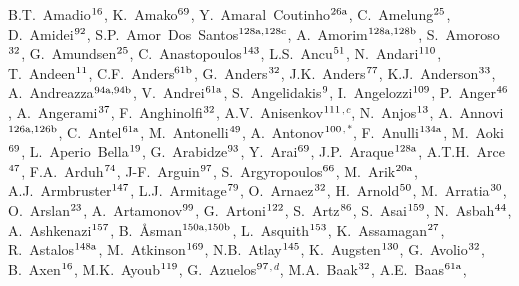 \begin{flushleft}
B.T.~Amadio$^\textrm{\scriptsize 16}$,
K.~Amako$^\textrm{\scriptsize 69}$,
Y.~Amaral~Coutinho$^\textrm{\scriptsize 26a}$,
C.~Amelung$^\textrm{\scriptsize 25}$,
D.~Amidei$^\textrm{\scriptsize 92}$,
S.P.~Amor~Dos~Santos$^\textrm{\scriptsize 128a,128c}$,
A.~Amorim$^\textrm{\scriptsize 128a,128b}$,
S.~Amoroso$^\textrm{\scriptsize 32}$,
G.~Amundsen$^\textrm{\scriptsize 25}$,
C.~Anastopoulos$^\textrm{\scriptsize 143}$,
L.S.~Ancu$^\textrm{\scriptsize 51}$,
N.~Andari$^\textrm{\scriptsize 110}$,
T.~Andeen$^\textrm{\scriptsize 11}$,
C.F.~Anders$^\textrm{\scriptsize 61b}$,
G.~Anders$^\textrm{\scriptsize 32}$,
J.K.~Anders$^\textrm{\scriptsize 77}$,
K.J.~Anderson$^\textrm{\scriptsize 33}$,
A.~Andreazza$^\textrm{\scriptsize 94a,94b}$,
V.~Andrei$^\textrm{\scriptsize 61a}$,
S.~Angelidakis$^\textrm{\scriptsize 9}$,
I.~Angelozzi$^\textrm{\scriptsize 109}$,
P.~Anger$^\textrm{\scriptsize 46}$,
A.~Angerami$^\textrm{\scriptsize 37}$,
F.~Anghinolfi$^\textrm{\scriptsize 32}$,
A.V.~Anisenkov$^\textrm{\scriptsize 111}$$^{,c}$,
N.~Anjos$^\textrm{\scriptsize 13}$,
A.~Annovi$^\textrm{\scriptsize 126a,126b}$,
C.~Antel$^\textrm{\scriptsize 61a}$,
M.~Antonelli$^\textrm{\scriptsize 49}$,
A.~Antonov$^\textrm{\scriptsize 100}$$^{,*}$,
F.~Anulli$^\textrm{\scriptsize 134a}$,
M.~Aoki$^\textrm{\scriptsize 69}$,
L.~Aperio~Bella$^\textrm{\scriptsize 19}$,
G.~Arabidze$^\textrm{\scriptsize 93}$,
Y.~Arai$^\textrm{\scriptsize 69}$,
J.P.~Araque$^\textrm{\scriptsize 128a}$,
A.T.H.~Arce$^\textrm{\scriptsize 47}$,
F.A.~Arduh$^\textrm{\scriptsize 74}$,
J-F.~Arguin$^\textrm{\scriptsize 97}$,
S.~Argyropoulos$^\textrm{\scriptsize 66}$,
M.~Arik$^\textrm{\scriptsize 20a}$,
A.J.~Armbruster$^\textrm{\scriptsize 147}$,
L.J.~Armitage$^\textrm{\scriptsize 79}$,
O.~Arnaez$^\textrm{\scriptsize 32}$,
H.~Arnold$^\textrm{\scriptsize 50}$,
M.~Arratia$^\textrm{\scriptsize 30}$,
O.~Arslan$^\textrm{\scriptsize 23}$,
A.~Artamonov$^\textrm{\scriptsize 99}$,
G.~Artoni$^\textrm{\scriptsize 122}$,
S.~Artz$^\textrm{\scriptsize 86}$,
S.~Asai$^\textrm{\scriptsize 159}$,
N.~Asbah$^\textrm{\scriptsize 44}$,
A.~Ashkenazi$^\textrm{\scriptsize 157}$,
B.~{\AA}sman$^\textrm{\scriptsize 150a,150b}$,
L.~Asquith$^\textrm{\scriptsize 153}$,
K.~Assamagan$^\textrm{\scriptsize 27}$,
R.~Astalos$^\textrm{\scriptsize 148a}$,
M.~Atkinson$^\textrm{\scriptsize 169}$,
N.B.~Atlay$^\textrm{\scriptsize 145}$,
K.~Augsten$^\textrm{\scriptsize 130}$,
G.~Avolio$^\textrm{\scriptsize 32}$,
B.~Axen$^\textrm{\scriptsize 16}$,
M.K.~Ayoub$^\textrm{\scriptsize 119}$,
G.~Azuelos$^\textrm{\scriptsize 97}$$^{,d}$,
M.A.~Baak$^\textrm{\scriptsize 32}$,
A.E.~Baas$^\textrm{\scriptsize 61a}$,
$$
\end{flushleft}

